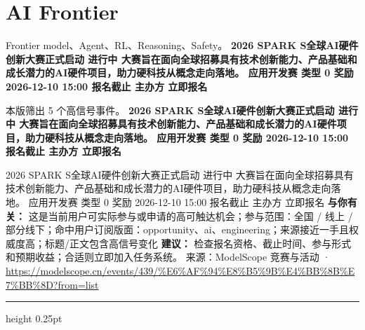 \documentclass[10.5pt]{ctexart}
\begin{document}
\section*{AI Frontier}
{\color{ormuted} Frontier model、Agent、RL、Reasoning、Safety。}
\vspace{2mm}
{\LARGE\bfseries 2026 SPARK S全球AI硬件创新大赛正式启动 进行中 大赛旨在面向全球招募具有技术创新能力、产品基础和成长潜力的AI硬件项目，助力硬科技从概念走向落地。 应用开发赛 类型 0 奖励 2026-12-10 15:00 报名截止 主办方 立即报名}\par
\vspace{1mm}
{\color{ormuted} 本版筛出 5 个高信号事件。}
\vspace{3mm}
{\Large\bfseries 2026 SPARK S全球AI硬件创新大赛正式启动 进行中 大赛旨在面向全球招募具有技术创新能力、产品基础和成长潜力的AI硬件项目，助力硬科技从概念走向落地。 应用开发赛 类型 0 奖励 2026-12-10 15:00 报名截止 主办方 立即报名}\par
2026 SPARK S全球AI硬件创新大赛正式启动 进行中 大赛旨在面向全球招募具有技术创新能力、产品基础和成长潜力的AI硬件项目，助力硬科技从概念走向落地。 应用开发赛 类型 0 奖励 2026-12-10 15:00 报名截止 主办方 立即报名
\textbf{与你有关：} 这是当前用户可实际参与或申请的高可触达机会；参与范围：全国 / 线上 / 部分线下；命中用户订阅版面：opportunity、ai、engineering；来源接近一手且权威度高；标题/正文包含高信号变化
\textbf{建议：} 检查报名资格、截止时间、参与形式和预期收益；合适则立即加入任务系统。
{\footnotesize\color{ormuted} 来源：ModelScope 竞赛与活动 · \url{https://modelscope.cn/events/439/%E6%AF%94%E8%B5%9B%E4%BB%8B%E7%BB%8D?from=list}}
\vspace{4mm}
\hrule height 0.25pt
\vspace{3mm}
\end{document}
